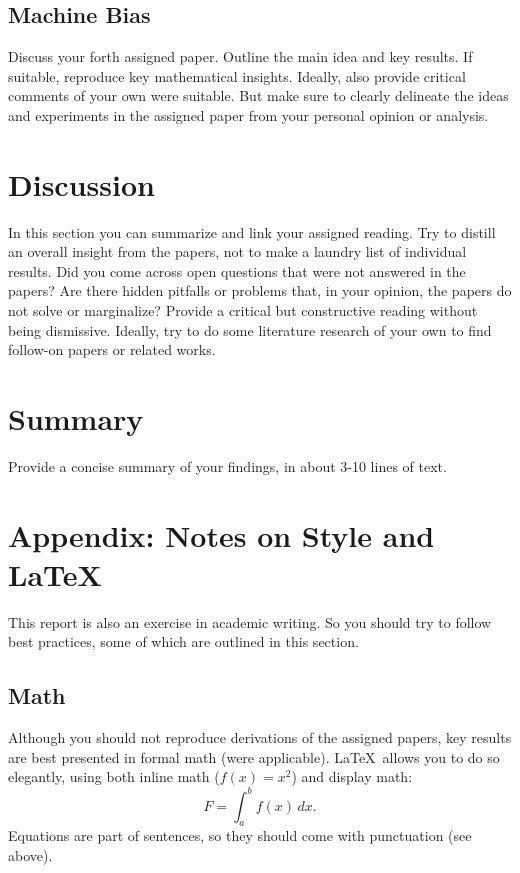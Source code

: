 \documentclass{article}
\begin{document}
\subsection{Machine Bias}

Discuss your forth assigned paper. Outline the main idea and key results. If suitable, reproduce key mathematical insights. Ideally, also provide critical comments of your own were suitable. But make sure to clearly delineate the ideas and experiments in the assigned paper from your personal opinion or analysis.

\section{Discussion}

In this section you can summarize and link your assigned reading. Try to distill an overall insight from the papers, not to make a laundry list of individual results. Did you come across open questions that were not answered in the papers? Are there hidden pitfalls or problems that, in your opinion, the papers do not solve or marginalize? Provide a critical but constructive reading without being dismissive. Ideally, try to do some literature research of your own to find follow-on papers or related works. 

\section{Summary}

Provide a concise summary of your findings, in about 3-10 lines of text.

\section{Appendix: Notes on Style and \LaTeX}

This report is also an exercise in academic writing. So you should try to follow best practices, some of which are outlined in this section.

\subsection{Math}

Although you should not reproduce derivations of the assigned papers, key results are best presented in formal math (were applicable). \LaTeX~allows you to do so elegantly, using both inline math ($f(x)=x^2$) and display math:
\begin{equation}
  F = \int_a ^b f(x)\,dx.
\end{equation}
Equations are part of sentences, so they should come with punctuation (see above).
\end{document}
